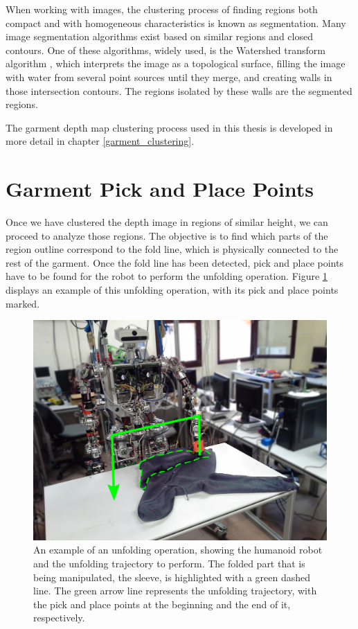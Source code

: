 When working with images, the clustering process of finding regions both compact and with homogeneous characteristics is known as segmentation. Many image segmentation algorithms exist based on similar regions and closed contours. One of these algorithms, widely used, is the Watershed transform algorithm \cite{digabel1978iterative}, which interprets the image as a topological surface, filling the image with water from several point sources until they merge, and creating walls in those intersection contours. The regions isolated by these walls are the segmented regions.

\pagebreak

The garment depth map clustering process used in this thesis is developed in more detail in chapter \ref{garment_clustering}.

\section{Garment Pick and Place Points}
\label{garment_PnP_points}

Once we have clustered the depth image in regions of similar height, we can proceed to analyze those regions. The objective is to find which parts of the region outline correspond to the fold line, which is physically connected to the rest of the garment. Once the fold line has been detected, pick and place points have to be found for the robot to perform the unfolding operation. Figure \ref{fig:picking_points} displays an example of this unfolding operation, with its pick and place points marked.

\begin{figure}[thpb]
    \centering
    \includegraphics[width=0.8
    \textwidth]{figures/teo-pick-and-place.pdf}
    \caption[An example of an unfolding operation, showing the humanoid robot and the unfolding trajectory to perform.]
    {An example of an unfolding operation, showing the humanoid robot and the unfolding trajectory to perform. The folded part that is being manipulated, the sleeve, is highlighted with a green dashed line. The green arrow line represents the unfolding trajectory, with the pick and place points at the beginning and the end of it, respectively.}
    \label{fig:picking_points}
\end{figure}


